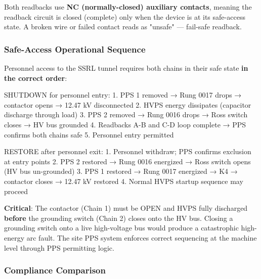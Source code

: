 Both readbacks use \textbf{NC (normally-closed) auxiliary contacts}, meaning the readback circuit is closed (complete) only when the device is at its safe-access state. A broken wire or failed contact reads as "unsafe" --- fail-safe readback.

\subsubsection{Safe-Access Operational Sequence}\label{sec:pps-sequence}


Personnel access to the SSRL tunnel requires both chains in their safe state \textbf{in the correct order}:

\begin{sigblock}
SHUTDOWN for personnel entry:
  1. PPS 1 removed → Rung 0017 drops → contactor opens → 12.47 kV disconnected
  2. HVPS energy dissipates (capacitor discharge through load)
  3. PPS 2 removed → Rung 0016 drops → Ross switch closes → HV bus grounded
  4. Readbacks A-B and C-D loop complete → PPS confirms both chains safe
  5. Personnel entry permitted

RESTORE after personnel exit:
  1. Personnel withdraw; PPS confirms exclusion at entry points
  2. PPS 2 restored → Rung 0016 energized → Ross switch opens (HV bus un-grounded)
  3. PPS 1 restored → Rung 0017 energized → K4 → contactor closes → 12.47 kV restored
  4. Normal HVPS startup sequence may proceed
\end{sigblock}

\begin{keynote}
\textbf{Critical}: The contactor (Chain 1) must be OPEN and HVPS fully discharged \textbf{before} the grounding switch (Chain 2) closes onto the HV bus. Closing a grounding switch onto a live high-voltage bus would produce a catastrophic high-energy arc fault. The site PPS system enforces correct sequencing at the machine level through PPS permitting logic.
\end{keynote}

\subsubsection{Compliance Comparison}\label{sec:pps-compliance}


